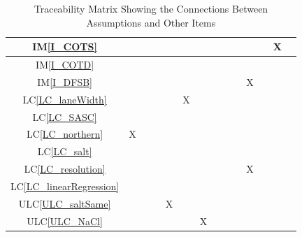 \documentclass[12pt]{article}
\newcommand{\iref}[1]{IM\ref{#1}}
\newcommand{\lcref}[1]{LC\ref{#1}}
\newcommand{\ulcref}[1]{ULC\ref{#1}}
\begin{document}
\begin{table}[H]
\begin{tabular}{|c|c|c|c|c|c|c|c|c|c|c|c|c|c|}
\iref{I_COTS}       & & & & & && & & & & & X & \\ \hline
\iref{I_COTD}       & & & & & & & & &  & && & \\ \hline
\iref{I_DFSB}       & & &  & & && &  & & X & & &\\ \hline
\lcref{LC_laneWidth}     &  & & && X & &  & & &  & && \\ \hline
\lcref{LC_SASC}   & & &  & & && & &  & && & \\ \hline
\lcref{LC_northern} & X &  & & && & & &  & && & \\ \hline
\lcref{LC_salt} & & & & & & & & &  & && & \\ \hline
\lcref{LC_resolution} & & & & & & & & &  & X && & \\ \hline
\lcref{LC_linearRegression}  & & & & & & & & &  & && & \\ \hline
\ulcref{ULC_saltSame}    & & && X & & &  && & & &  &\\ \hline
\ulcref{ULC_NaCl}   & & & & & & X &  & & && &  & \\ \hline

\hline
\end{tabular}
\caption{Traceability Matrix Showing the Connections Between Assumptions and Other Items}
\label{Table:A_others}
\end{table}
\end{document}

